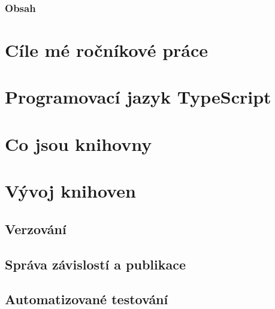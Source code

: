 




\begin{frame}
    \frametitle{Obsah}
    \tableofcontents
\end{frame}

\section[Ročníková práce]{Cíle mé ročníkové práce}	

	

\section[TypeScript]{Programovací jazyk TypeScript}





\section[Knihovny]{Co jsou knihovny}



\section[Vývoj knihoven]{Vývoj knihoven}

	

\subsection{Verzování}



\subsection[Správce balíčků]{Správa závislostí a publikace}



\subsection[Testování]{Automatizované testování}

